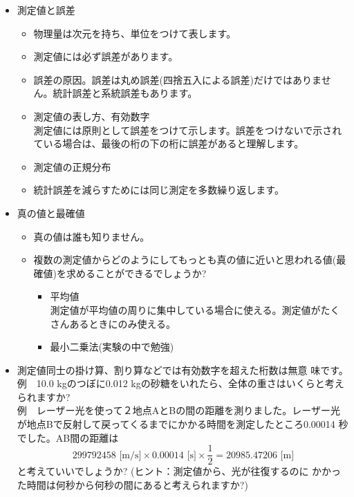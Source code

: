 \begin{itemize}

\item 測定値と誤差

\begin{itemize}

\item 物理量は次元を持ち、単位をつけて表します。

\item 測定値には必ず誤差があります。

\item 誤差の原因。誤差は丸め誤差(四捨五入による誤差)だけではありません。統計誤差と系統誤差もあります。

\item 測定値の表し方、有効数字\\
測定値には原則として誤差をつけて示します。誤差をつけないで示されている場合は、最後の桁の下の桁に誤差があると理解します。

\item 測定値の正規分布

\item 統計誤差を減らすためには同じ測定を多数繰り返します。

\end{itemize}


\item 真の値と最確値

\begin{itemize}

\item 真の値は誰も知りません。

\item 複数の測定値からどのようにしてもっとも真の値に近いと思われる値(最確値)を求めることができるでしょうか?

\begin{itemize}
\item 平均値\\
測定値が平均値の周りに集中している場合に使える。測定値がたくさんあるときにのみ使える。
\item 最小二乗法(実験の中で勉強)

\end{itemize}

\end{itemize}

\item 測定値同士の掛け算、割り算などでは有効数字を超えた桁数は無意 
味です。\\
例　10.0 kgのつぼに0.012 kgの砂糖をいれたら、全体の重さはいくらと考えられますか? \\
例　レーザー光を使って２地点AとBの間の距離を測りました。レーザー光が地点Bで反射して戻ってくるまでにかかる時間を測定したところ0.00014 秒でした。AB間の距離は
\[
299792458 \text{ [m/s]}\times 0.00014\text{ [s]} \times \frac{1}{2} 
= 20985.47206 \text{ [m]}
\]
と考えていいでしょうか? (ヒント：測定値から、光が往復するのに 
かかった時間は何秒から何秒の間にあると考えられますか?)


\end{itemize}
